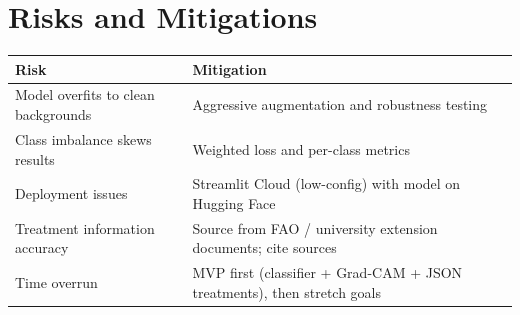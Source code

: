 \documentclass[11pt,a4paper]{article}
\begin{document}
\section{Risks and Mitigations}
\begin{table}[h]
\centering
\begin{tabular}{@{}p{6cm}p{9.4cm}@{}}
\toprule
Risk & Mitigation \\
\midrule
Model overfits to clean backgrounds & Aggressive augmentation and robustness testing \\
Class imbalance skews results & Weighted loss and per-class metrics \\
Deployment issues & Streamlit Cloud (low-config) with model on Hugging Face \\
Treatment information accuracy & Source from FAO / university extension documents; cite sources \\
Time overrun & MVP first (classifier + Grad-CAM + JSON treatments), then stretch goals \\
\bottomrule
\end{tabular}
\end{table}
\end{document}
